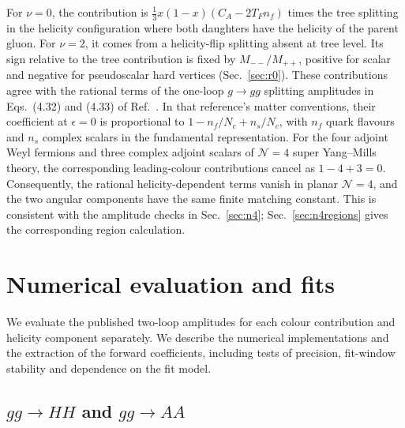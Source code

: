 \documentclass[%
 onecolumn,
 superscriptaddress,
 preprintnumbers,
 nofootinbib,
 amsmath,amssymb,
 aps,
 prl,
]{revtex4-2}
\begin{document}
For $\nu=0$, the contribution is
$\frac13x(1-x)(C_A-2T_Fn_f)$ times the
tree splitting in the helicity configuration
where both daughters have the helicity of
the parent gluon. For $\nu=2$, it comes
from a helicity-flip splitting absent at
tree level. Its sign relative to the tree
contribution is fixed by $M_{--}/M_{++}$,
positive for scalar and negative for
pseudoscalar hard vertices
(Sec.~\ref{sec:r0}).
%
These contributions agree with the rational
terms of the one-loop $g\to gg$ splitting
amplitudes in Eqs.~(4.32) and (4.33) of
Ref.~\cite{Bern:1999ry}. In that reference's
matter conventions, their coefficient at
$\epsilon=0$ is proportional to
$1-n_f/N_c+n_s/N_c$, with $n_f$ quark
flavours and $n_s$ complex scalars in the
fundamental representation.
For the four adjoint Weyl fermions and three
complex adjoint scalars of $\mathcal N=4$
super Yang--Mills theory, the corresponding
leading-colour contributions cancel as
$1-4+3=0$.
%
Consequently, the rational helicity-dependent
terms vanish in planar $\mathcal N=4$, and
the two angular components have the same
finite matching constant. This is consistent
with the amplitude checks in Sec.~\ref{sec:n4};
Sec.~\ref{sec:n4regions} gives the
corresponding region calculation.



\section{Numerical evaluation and fits}
\label{app:eval}

We evaluate the published two-loop amplitudes
for each colour contribution and helicity
component separately. We describe the numerical
implementations and the extraction of the
forward coefficients, including tests of
precision, fit-window stability and dependence
on the fit model.



\subsection{\texorpdfstring{$gg\to HH$ and $gg\to AA$}{gg -> HH and gg -> AA}}
\end{document}
